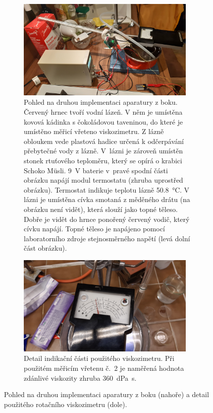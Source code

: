 \documentclass[12pt]{article}
\begin{document}
\begin{figure}
    \begin{subfigure}[t]{\textwidth}
        \centering
        \includegraphics[width = 0.95\textwidth]{prilohy/aparatura_bok.jpg}
        \caption{Pohled na druhou implementaci aparatury z boku. Červený hrnec tvoří vodní lázeň. V něm je umístěna kovová kádinka s čokoládovou taveninou, do které je umístěno měřicí vřeteno viskozimetru. Z lázně obloukem vede plastová hadice určená k odčerpávání přebytečné vody z lázně. V~lázni je zároveň umístěn stonek rtuťového teploměru, který se opírá o krabici Schoko Müsli. \SI{9}{\volt} baterie v~pravé spodní části obrázku napájí modul termostatu (zhruba uprostřed obrázku). Termostat indikuje teplotu lázně \SI{50,8}{\degreeCelsius}. V lázni je umístěna cívka smotaná z měděného drátu (na obrázku není vidět), která slouží jako topné těleso. Dobře je vidět do hrnce ponořený červený vodič, který cívku napájí. Topné těleso je napájeno pomocí laboratorního zdroje stejnosměrného napětí (levá dolní část obrázku).}
        \label{fig:aparatura_bok}
    \end{subfigure}
    \hfill
    \begin{subfigure}[t]{\textwidth}
        \centering
        \includegraphics[width = 0.95\textwidth]{prilohy/viskozimetr_1.jpg}
        \caption{Detail indikační části použitého viskozimetru. Při použitém měřicím vřetenu č.~2 je naměřená hodnota zdánlivé viskozity zhruba \SI{360}{\deci\pascal\second}.}
    \end{subfigure}
    \caption{Pohled na druhou implementaci aparatury z boku (nahoře) a detail použitého rotačního viskozimetru (dole).}
\end{figure}
\end{document}

